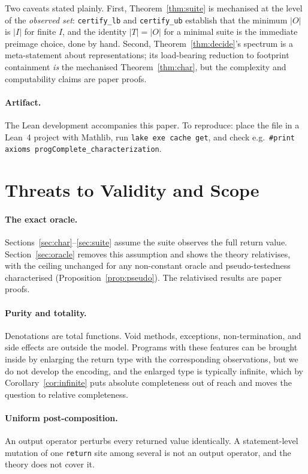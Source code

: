 \documentclass[runningheads,envcountsect,envcountsame]{llncs}
\begin{document}
Two caveats stated plainly. First, Theorem~\ref{thm:suite} is mechanised at the
level of the \emph{observed set}: \texttt{certify\_lb} and \texttt{certify\_ub}
establish that the minimum $|O|$ is $|I|$ for finite $I$, and the identity
$|T| = |O|$ for a minimal suite is the immediate preimage choice, done by hand.
Second, Theorem~\ref{thm:decide}'s spectrum is a meta-statement about
representations; its load-bearing reduction to footprint containment \emph{is}
the mechanised Theorem~\ref{thm:char}, but the complexity and computability
claims are paper proofs.

\paragraph{Artifact.}
The Lean development accompanies this paper. To reproduce: place the file in a
Lean~4 project with Mathlib, run \texttt{lake exe cache get}, and check e.g.\
\texttt{\#print axioms progComplete\_characterization}.

\section{Threats to Validity and Scope}
\label{sec:threats}

\paragraph{The exact oracle.}
Sections~\ref{sec:char}--\ref{sec:suite} assume the suite observes the full
return value. Section~\ref{sec:oracle} removes this assumption and shows the
theory relativises, with the ceiling unchanged for any non-constant oracle and
pseudo-testedness characterised (Proposition~\ref{prop:pseudo}). The relativised
results are paper proofs.

\paragraph{Purity and totality.}
Denotations are total functions. Void methods, exceptions, non-termination, and
side effects are outside the model. Programs with these features can be brought
inside by enlarging the return type with the corresponding observations, but we
do not develop the encoding, and the enlarged type is typically infinite, which
by Corollary~\ref{cor:infinite} puts absolute completeness out of reach and moves
the question to relative completeness.

\paragraph{Uniform post-composition.}
An output operator perturbs every returned value identically. A statement-level
mutation of one \texttt{return} site among several is not an output operator, and
the theory does not cover it.
\end{document}
